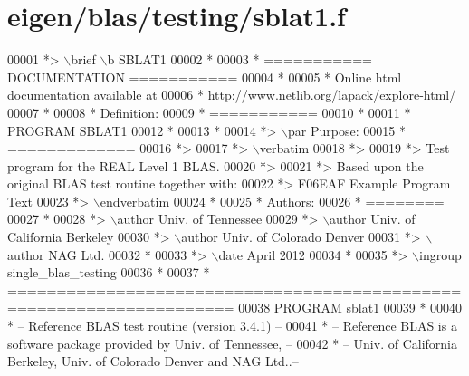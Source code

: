 \hypertarget{eigen_2blas_2testing_2sblat1_8f_source}{}\section{eigen/blas/testing/sblat1.f}
\label{eigen_2blas_2testing_2sblat1_8f_source}

\begin{DoxyCode}
00001 \textcolor{comment}{*> \(\backslash\)brief \(\backslash\)b SBLAT1}
00002 \textcolor{comment}{*}
00003 \textcolor{comment}{*  =========== DOCUMENTATION ===========}
00004 \textcolor{comment}{*}
00005 \textcolor{comment}{* Online html documentation available at }
00006 \textcolor{comment}{*            http://www.netlib.org/lapack/explore-html/ }
00007 \textcolor{comment}{*}
00008 \textcolor{comment}{*  Definition:}
00009 \textcolor{comment}{*  ===========}
00010 \textcolor{comment}{*}
00011 \textcolor{comment}{*       PROGRAM SBLAT1}
00012 \textcolor{comment}{* }
00013 \textcolor{comment}{*}
00014 \textcolor{comment}{*> \(\backslash\)par Purpose:}
00015 \textcolor{comment}{*  =============}
00016 \textcolor{comment}{*>}
00017 \textcolor{comment}{*> \(\backslash\)verbatim}
00018 \textcolor{comment}{*>}
00019 \textcolor{comment}{*>    Test program for the REAL Level 1 BLAS.}
00020 \textcolor{comment}{*>}
00021 \textcolor{comment}{*>    Based upon the original BLAS test routine together with:}
00022 \textcolor{comment}{*>    F06EAF Example Program Text}
00023 \textcolor{comment}{*> \(\backslash\)endverbatim}
00024 \textcolor{comment}{*}
00025 \textcolor{comment}{*  Authors:}
00026 \textcolor{comment}{*  ========}
00027 \textcolor{comment}{*}
00028 \textcolor{comment}{*> \(\backslash\)author Univ. of Tennessee }
00029 \textcolor{comment}{*> \(\backslash\)author Univ. of California Berkeley }
00030 \textcolor{comment}{*> \(\backslash\)author Univ. of Colorado Denver }
00031 \textcolor{comment}{*> \(\backslash\)author NAG Ltd. }
00032 \textcolor{comment}{*}
00033 \textcolor{comment}{*> \(\backslash\)date April 2012}
00034 \textcolor{comment}{*}
00035 \textcolor{comment}{*> \(\backslash\)ingroup single\_blas\_testing}
00036 \textcolor{comment}{*}
00037 \textcolor{comment}{*  =====================================================================}
00038       \textcolor{keyword}{PROGRAM} sblat1
00039 \textcolor{comment}{*}
00040 \textcolor{comment}{*  -- Reference BLAS test routine (version 3.4.1) --}
00041 \textcolor{comment}{*  -- Reference BLAS is a software package provided by Univ. of Tennessee,    --}
00042 \textcolor{comment}{*  -- Univ. of California Berkeley, Univ. of Colorado Denver and NAG Ltd..--}

\end{DoxyCode}
